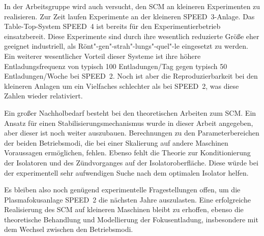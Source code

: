 In der Arbeitsgruppe wird auch versucht, den SCM an kleineren
Experimenten zu realisieren. Zur Zeit laufen Experimente an der
kleineren SPEED~3-Anlage. Das Table-Top-System SPEED~4 ist bereits
für den Experimentierbetrieb einsatzbereit. Diese Experimente sind
durch ihre wesentlich reduzierte Größe eher geeignet industriell,
als Rönt"-gen"-strah"-lungs"-quel"-le eingesetzt zu werden. Ein
weiterer wesentlicher Vorteil dieser Systeme ist ihre höhere
Entladungsfrequenz von typisch 100 Entladungen/Tag gegen typisch
50 Entladungen/Woche bei SPEED~2. Noch ist aber die
Reproduzierbarkeit bei den kleineren Anlagen um ein Vielfaches
schlechter als bei SPEED~2, was diese Zahlen wieder relativiert.
\par
Ein großer Nachholbedarf besteht bei den theoretischen Arbeiten zum
SCM. Ein Ansatz für einen Stabilisierungsmechanismus wurde in dieser
Arbeit angegeben, aber dieser ist noch weiter auszubauen. Berechnungen
zu den Parameterbereichen der beiden Betriebsmodi, die bei einer
Skalierung auf andere Maschinen Voraussagen ermöglichen, fehlen. Ebenso
fehlt die Theorie zur Konditionierung der Isolatoren und des
Zündvorganges auf der Isolatoroberfläche. Diese würde bei der
experimentell sehr aufwendigen Suche nach dem optimalen Isolator
helfen.
\par
Es bleiben also noch genügend experimentelle Fragestellungen offen, um
die Plasmafokusanlage SPEED~2 die nächsten Jahre auszulasten. Eine
erfolgreiche Realisierung des SCM auf kleineren Maschinen bleibt zu
erhoffen, ebenso die theoretische Behandlung und Modellierung der
Fokusentladung, insbesondere mit dem Wechsel zwischen den Betriebsmodi.
